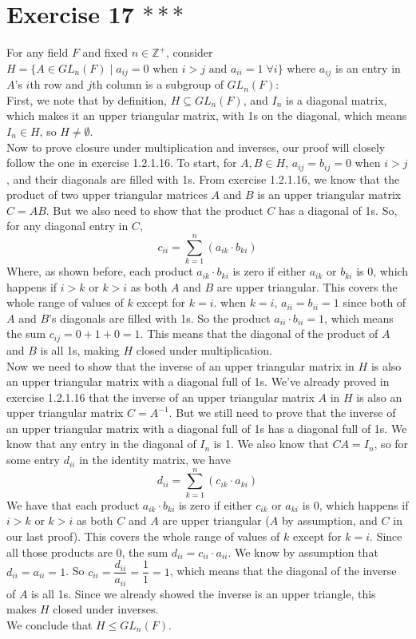 \documentclass[12pt]{article}
\newcommand{\Z}{\mathbb{Z}}
\begin{document}
    \section*{Exercise 17 $***$}
    For any field $F$ and fixed $n \in \Z^+$,
    consider $H = \{ A \in GL_n(F) \mid a_{ij} = 0 \text{ when } i > j
    \text{ and } a_{ii} = 1 \; \forall i \}$
    where $a_{ij}$ is an entry in $A$'s $i$th row and $j$th column
    is a subgroup of $GL_n(F)$: \\
    First, we note that by definition, $H \subseteq GL_n(F)$,
    and $I_n$ is a diagonal matrix,
    which makes it an upper triangular matrix,
    with 1s on the diagonal,
    which means $I_n \in H$,
    so $H \neq \emptyset$. \\ 
    Now to prove closure under multiplication and inverses,
    our proof will closely follow the one in exercise 1.2.1.16.
    To start, for $A, B \in H$, $a_{ij} = b_{ij} = 0$ when $i > j$,
    and their diagonals are filled with 1s.
    From exercise 1.2.1.16, we know that the product
    of two upper triangular matrices $A$ and $B$ is an upper triangular
    matrix $C = AB$.
    But we also need to show that the product $C$ has a diagonal of 1s.
    So, for any diagonal entry in $C$,
    \[ c_{ii} = \sum_{k = 1}^n (a_{ik} \cdot b_{ki}) \]
    Where, as shown before,
    each product $a_{ik} \cdot b_{ki}$ is zero 
    if either $a_{ik}$ or $b_{ki}$ is 0,
    which happens if $i > k$ or $k > i$
    as both $A$ and $B$ are upper triangular.
    This covers the whole range of values of $k$
    except for $k = i$.
    when $k = i$, $a_{ii} = b_{ii} = 1$
    since both of $A$ and $B$'s diagonals are filled with 1s.
    So the product $a_{ii} \cdot b_{ii} = 1$,
    which means the sum $c_{ij} = 0 + 1 + 0 = 1$.
    This means that the diagonal of the product of $A$ and $B$ is all 1s, 
    making $H$ closed under multiplication. \\ 
    Now we need to show that the inverse of an upper triangular
    matrix in $H$ is also an upper triangular
    matrix with a diagonal full of 1s.
    We've already proved in exercise 1.2.1.16 that 
    the inverse of an upper triangular matrix $A$ in $H$
    is also an upper triangular matrix $C = A^{-1}$. 
    But we still need to prove that the inverse of an upper triangular
    matrix with a diagonal full of 1s has a diagonal full of 1s.
    We know that any entry in the diagonal of $I_n$ is 1.
    We also know that $CA = I_n$,
    so for some entry $d_{ii}$ in the identity matrix, we have
    \[ d_{ii} = \sum_{k = 1}^n (c_{ik} \cdot a_{ki}) \]
    We have that each product $a_{ik} \cdot b_{ki}$ is zero 
    if either $c_{ik}$ or $a_{ki}$ is 0,
    which happens if $i > k$ or $k > i$
    as both $C$ and $A$ are upper triangular
    ($A$ by assumption, and $C$ in our last proof).
    This covers the whole range of values of $k$
    except for $k = i$.
    Since all those products are 0,
    the sum $d_{ii} = c_{ii} \cdot a_{ii}$.
    We know by assumption that $d_{ii} = a_{ii} = 1$.
    So $c_{ii} = \dfrac{d_{ii}}{a_{ii}} = \dfrac{1}{1} = 1$,
    which means that the diagonal of the inverse of $A$ is all 1s.
    Since we already showed the inverse is an upper triangle,
    this makes $H$ closed under inverses. \\
    We conclude that $H \leqslant GL_n(F)$.
\end{document}
